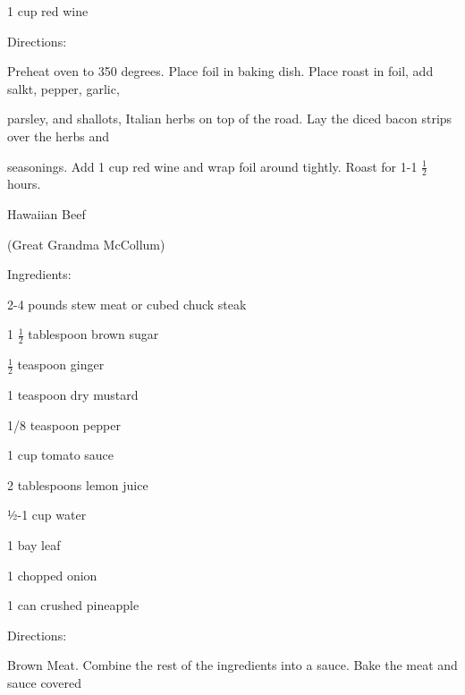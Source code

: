 \documentclass[a4paper,portrait,12pt]{book}
\begin{document}
1 cup red wine




Directions:




Preheat oven to 350 degrees. Place foil in baking dish. Place roast in foil, add salkt, pepper, garlic,




parsley, and shallots, Italian herbs on top of the road. Lay the diced bacon strips over the herbs and




seasonings. Add 1 cup red wine and wrap foil around tightly. Roast for 1-1 $\frac{1}{2}$ hours.







\newpage
Hawaiian Beef




(Great Grandma McCollum)




Ingredients:




2-4 pounds stew meat or cubed chuck steak




1 $\frac{1}{2}$ tablespoon brown sugar




$\frac{1}{2}$ teaspoon ginger




1 teaspoon dry mustard




1/8 teaspoon pepper




1 cup tomato sauce




2 tablespoons lemon juice




½-1 cup water




1 bay leaf




1 chopped onion




1 can crushed pineapple




Directions:




Brown Meat. Combine the rest of the ingredients into a sauce. Bake the meat and sauce covered
\end{document}
